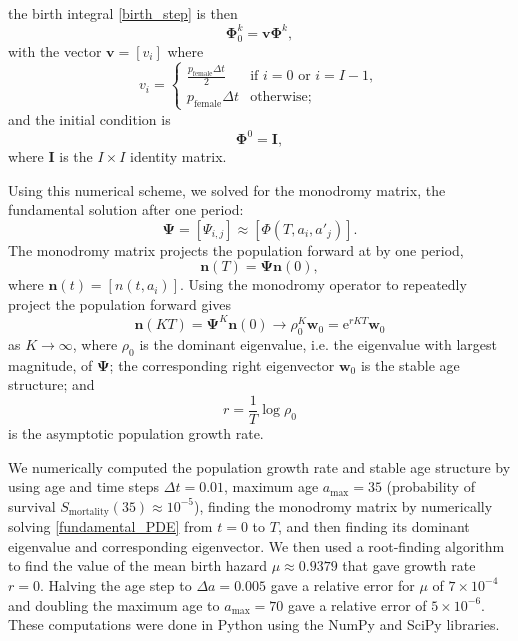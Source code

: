 \documentclass[12pt]{article}
\renewcommand{\vec}[1]{\mathbf{#1}}
\newcommand{\mat}[1]{\mathbf{#1}}
\newcommand{\me}{\mathrm{e}}
\begin{document}
the birth integral \eqref{birth_step} is then
\begin{equation}
  \mat{\Phi}_0^k = \vec{v} \mat{\Phi}^k,
\end{equation}
with the vector $\vec{v} = [v_i]$ where
\begin{equation}
  v_i =
  \begin{cases}
    \frac{p_{\text{female}} \Delta t}{2}
    & \text{if $i = 0$ or $i = I - 1$}, \\
    p_{\text{female}} \Delta t
    & \text{otherwise};
  \end{cases}
\end{equation}
and the initial condition is
\begin{equation}
  \mat{\Phi}^0 = \mat{I},
\end{equation}
where $\mat{I}$ is the $I \times I$ identity matrix.

Using this numerical scheme, we solved for the monodromy matrix, the
fundamental solution after one period:
\begin{equation}
  \mat{\Psi} = [\Psi_{i, j}] \approx [\Phi(T, a_i, a'_j)].
\end{equation}
The monodromy matrix projects the population forward at by one period,
\begin{equation}
  \vec{n}(T) = \mat{\Psi} \vec{n}(0),
\end{equation}
where $\vec{n}(t) = [n(t, a_i)]$.
Using the monodromy operator to repeatedly project the population
forward gives
\begin{equation}
  \vec{n}(K T)
  = \mat{\Psi}^K \vec{n}(0)
  \to \rho_0^K \vec{w}_0
  = \me^{r K T} \vec{w}_0
\end{equation}
as $K \to \infty$,
where $\rho_0$ is the dominant eigenvalue, i.e. the eigenvalue with
largest magnitude, of $\mat{\Psi}$;
the corresponding right eigenvector $\vec{w}_0$ is the stable age
structure; and
\begin{equation}
  r = \frac{1}{T} \log \rho_0
\end{equation}
is the asymptotic population growth rate.

We numerically computed the population growth rate and stable age
structure by using age and time steps $\Delta t = 0.01$,
maximum age $a_{\text{max}} = 35$
(probability of survival
$S_{\text{mortality}}(35) \approx 10^{-5}$),
finding the monodromy matrix by numerically solving
\eqref{fundamental_PDE} from $t = 0$ to $T$, and
then finding its dominant eigenvalue and corresponding eigenvector.
We then used a root-finding algorithm to find the value of the mean
birth hazard $\mu \approx 0.9379$ that gave growth rate $r = 0$.
Halving the age step to $\Delta a = 0.005$
gave a relative error for $\mu$ of $7 \times 10^{-4}$
and doubling the maximum age to $a_{\text{max}} = 70$
gave a relative error of $5 \times 10^{-6}$.
These computations were done in Python \autocite{python} using the
NumPy \autocite{numpy} and SciPy \autocite{scipy} libraries.
\end{document}
